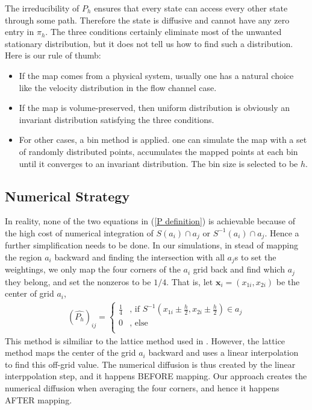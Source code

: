 \documentclass{article}
\begin{document}
The irreducibility of $P_h$ ensures that every state can access every other state through some path. Therefore the state is diffusive and cannot have any zero entry in $\pi_h$. The three conditions certainly eliminate most of the unwanted stationary distribution, but it does not tell us how to find such a distribution. Here is our rule of thumb:
\begin{itemize}
  \item If the map comes from a physical system, usually one has a
  natural choice like the velocity distribution in the flow channel case.
  \item If the map is volume-preserved, then uniform distribution is
  obviously an invariant distribution satisfying the three
  conditions.
  \item For other cases, a bin method is applied. one can simulate the map with a set of randomly
  distributed points, accumulates the mapped points at each bin until it converges to
  an invariant distribution. The bin size is selected to be $h$. 
\end{itemize}

 


\subsection{Numerical Strategy}
In reality, none of the two equations in (\ref{P definition}) is achievable because of the high cost of numerical integration of $S(a_i) \cap a_j$ or $S^{-1}(a_i) \cap a_j$. Hence a further simplification needs to be done. In our simulations, in stead of mapping the region $a_i$ backward and finding the intersection with all $a_j$s to set the weightings, we only map the four corners of the $a_i$ grid back and find which $a_j$ they belong, and set the nonzeros to be $1/4$. That is, let $\mathbf{x}_i=(x_{1i},x_{2i})$ be the center of grid $a_i$,
 \begin{eqnarray}
   (\hat{P_h})_{ij} =\left\{ \begin{array}{cc}
                     \frac{1}{4} &\mbox{, if } S^{-1}(x_{1i}\pm \frac{h}{2},x_{2i}\pm \frac{h}{2}) \in a_j \\
                     0          &\mbox{, else} \\
                     \end{array} \right.              
 \end{eqnarray}
This method is silmiliar to the lattice method used in \cite{Tsang2005}\cite{Pierrehumbert2000}. However, the lattice method maps the center of the grid $a_i$ backward and uses a linear interpolation to find this off-grid value. The numerical diffusion is thus created by the linear interppolation step, and it happens BEFORE mapping. Our approach creates the numerical diffusion when averaging the four corners, and hence it happens AFTER mapping. 
\end{document}

